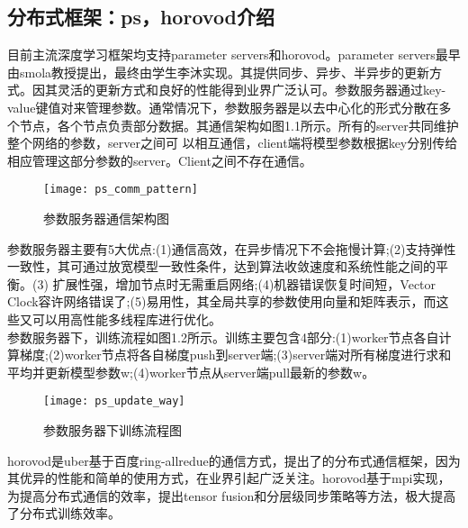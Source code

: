 \subsection{分布式框架：ps，horovod介绍}
目前主流深度学习框架均支持parameter servers和horovod。parameter servers最早由smola教授提出，最终由学生李沐实现。其提供同步、异步、半异步的更新方式。因其灵活的更新方式和良好的性能得到业界广泛认可。参数服务器通过key-value键值对来管理参数。通常情况下，参数服务器是以去中心化的形式分散在多个节点，各个节点负责部分数据。其通信架构如图1.1所示。所有的server共同维护整个网络的参数，server之间可 以相互通信，client端将模型参数根据key分别传给相应管理这部分参数的server。Client之间不存在通信。\\
\begin{figure}[htp]
\centering
\texttt{[image: ps\_comm\_pattern]}
\caption{参数服务器通信架构图}
\end{figure}
参数服务器主要有5大优点:(1)通信高效，在异步情况下不会拖慢计算;(2)支持弹性一致性，其可通过放宽模型一致性条件，达到算法收敛速度和系统性能之间的平衡。(3) 扩展性强，增加节点时无需重启网络;(4)机器错误恢复时间短，Vector Clock容许网络错误了;(5)易用性，其全局共享的参数使用向量和矩阵表示，而这些又可以用高性能多线程库进行优化。\\
参数服务器下，训练流程如图1.2所示。训练主要包含4部分:(1)worker节点各自计算梯度;(2)worker节点将各自梯度push到server端;(3)server端对所有梯度进行求和平均并更新模型参数w;(4)worker节点从server端pull最新的参数w。\\
\begin{figure}[htp]
\centering
\texttt{[image: ps\_update\_way]}
\caption{参数服务器下训练流程图}
\end{figure}
horovod是uber基于百度ring-allredue的通信方式，提出了的分布式通信框架，因为其优异的性能和简单的使用方式，在业界引起广泛关注。horovod基于mpi实现，为提高分布式通信的效率，提出tensor fusion和分层级同步策略等方法，极大提高了分布式训练效率。

